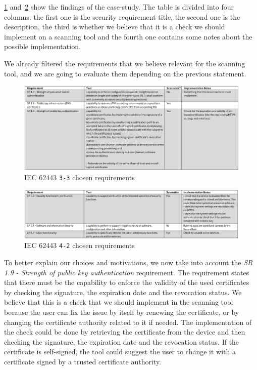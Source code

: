 \cref{fig:iec62443-findings-3_3} and~\cref{fig:iec62443-findings-4_2} show the findings of the case-study. The table is divided into four columns: the first one is the security requirement title, the second one is the description, the third is whether we believe that it is a check we should implement on a scanning tool and the fourth one contains some notes about the possible implementation.

We already filtered the requirements that we believe relevant for the scanning tool, and we are going to evaluate them depending on the previous statement.

\begin{figure}[ht]
  \centering
  \includegraphics[width=1.0\textwidth]{chapters/04/assets/iec62443-findings-3_3}
  \caption{IEC 62443 \texttt{3-3} chosen requirements}
  \label{fig:iec62443-findings-3_3}
\end{figure}

\begin{figure}[ht]
  \centering
  \includegraphics[width=1.0\textwidth]{chapters/04/assets/iec62443-findings-4_2}
  \caption{IEC 62443 \texttt{4-2} chosen requirements}
  \label{fig:iec62443-findings-4_2}
\end{figure}

To better explain our choices and motivations, we now take into account the \textit{SR 1.9 - Strength of public key authentication} requirement. The requirement states that there must be the capability to enforce the validity of the used certificates by checking the signature, the expiration date and the revocation status. We believe that this is a check that we should implement in the scanning tool because the user can fix the issue by itself by renewing the certificate, or by changing the certificate authority related to it if needed. The implementation of the check could be done by retrieving the certificate from the device and then checking the signature, the expiration date and the revocation status. If the certificate is self-signed, the tool could suggest the user to change it with a certificate signed by a trusted certificate authority.


